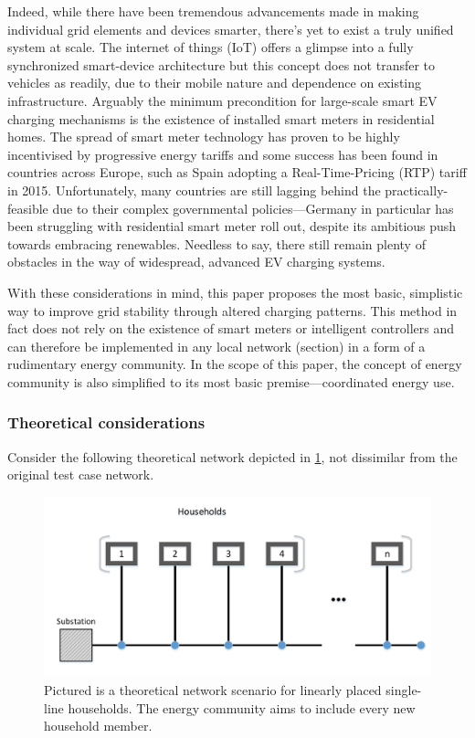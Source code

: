 \documentclass[a4paper,10pt]{report}
\begin{document}
Indeed, while there have been tremendous advancements made in making individual grid elements and devices smarter, there's yet to exist a truly unified system at scale. The internet of things (IoT) offers a glimpse into a fully synchronized smart-device architecture but this concept does not transfer to vehicles as readily, due to their mobile nature and dependence on existing infrastructure. Arguably the minimum precondition for large-scale smart EV charging mechanisms is the existence of installed smart meters in residential homes. The spread of smart meter technology has proven to be highly incentivised by progressive energy tariffs and some success has been found in countries across Europe, such as Spain adopting a Real-Time-Pricing (RTP) tariff in 2015. Unfortunately, many countries are still lagging behind the practically-feasible due to their complex governmental policies---Germany in particular has been struggling with residential smart meter roll out, despite its ambitious push towards embracing renewables. Needless to say, there still remain plenty of obstacles in the way of widespread, advanced EV charging systems.

With these considerations in mind, this paper proposes the most basic, simplistic way to improve grid stability through altered charging patterns. This method in fact does not rely on the existence of smart meters or intelligent controllers and can therefore be implemented in any local network (section) in a form of a rudimentary energy community. In the scope of this paper, the concept of energy community is also simplified to its most basic premise---coordinated energy use.

\subsubsection{Theoretical considerations}

Consider the following theoretical network depicted in \cref{comm_topology}, not dissimilar from the original test case network.
\FloatBarrier
\begin{figure}[htpb]
	\centering
	\includegraphics[width=0.7\linewidth]{comm_topology}
	\caption{Pictured is a theoretical network scenario for linearly placed single-line households. The energy community aims to include every new household member.}
	\label{comm_topology}
\end{figure}
\FloatBarrier
\end{document}
